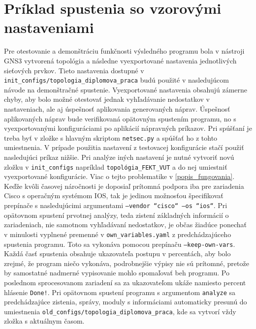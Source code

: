 \section{Príklad spustenia so vzorovými nastaveniami}
Pre otestovanie a demonštráciu funkčnosti výsledného programu bola v nástroji GNS3 vytvorená topológia a následne vyexportované nastavenia jednotlivých sieťových prvkov. Tieto nastavenia dostupné v \texttt{init\_configs/topologia\_diplomova\_praca} budú použité v nasledujúcom návode na demonštračné spustenie. Vyexportované nastavenia obsahujú zámerne chyby, aby bolo možné otestovať jednak vyhľadávanie nedostatkov v nastaveniach, ale aj úspešnosť aplikovania generovaných náprav. Úspešnosť aplikovaných náprav bude verifikovaná opätovným spustením programu, no s vyexportovanými konfiguráciami po aplikácií nápravných príkazov. Pri spúšťaní je treba byť v zložke s hlavným skriptom \texttt{netsec.py} a spúšťať ho z tohto umiestnenia. V prípade použitia nastavení z testovacej konfigurácie stačí použiť nasledujúci príkaz nižšie. Pri analýze iných nastavení je nutné vytvoriť novú zložku v \texttt{init\_configs} napríklad \texttt{topológia\_FEKT\_VUT} a do nej umiestniť vyexportované konfigurácie. Viac o tejto problematike v \ref{popis_fungovania}. Keďže kvôli časovej náročnosti je doposiaľ prítomná podpora iba pre zariadenia Cisco s operačným systémom IOS, tak je jedinou možnosťou špecifikovať prepínače s nasledujúcimi argumentami \texttt{---vendor ``cisco`` ---os ``ios``}. Pri opätovnom spustení prvotnej analýzy, teda zistení základných informácií o zariadeniach, nie samotnom vyhľadávaní nedostatkov, je občas žiadúce ponechať v minulosti vyplnené premenné v \texttt{own\_variables.yaml} z predchádzajúceho spustenia programu. Toto sa vykonáva pomocou prepínaču \texttt{---keep-own-vars}. Každá časť spustenia obsahuje ukazovateľa postupu v percentách, aby bolo zrejmé, že program niečo vykonáva, podrobnejšie výpisy nie sú prítomné, pretože by samostatné nadmerné vypisovanie mohlo spomaľovať beh programu. Po poslednom sprocesovanom zariadení sa za ukazovateľom ukáže namiesto percent hlásenie \texttt{Done!}. Pri opätovnom spustení programu s argumentom \texttt{analyze} sa predchádzajúce zistenia, správy, moduly s informáciami automaticky presunú do umiestnenia \texttt{old\_configs/topologia\_diplomova\_praca}, kde sa vytvorí vždy zložka s aktuálnym časom.

